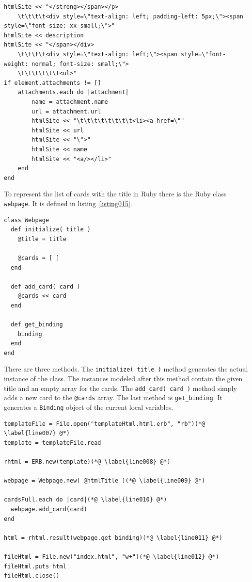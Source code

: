 \begin{lstlisting}[aboveskip=1\baselineskip, caption=Generating HTML without a templating engine., label=listing014]
htmlSite << "</strong></span></p>
	\t\t\t\t<div style=\"text-align: left; padding-left: 5px;\"><span style=\"font-size: xx-small;\">"
htmlSite << description		
htmlSite << "</span></div>
	\t\t\t\t<div style=\"text-align: left;\"><span style=\"font-weight: normal; font-size: small;\"> 
	\t\t\t\t\t\t<ul>"
if element.attachments != []
	attachments.each do |attachment|
		name = attachment.name
		url = attachment.url
		htmlSite << "\t\t\t\t\t\t\t\t<li><a href=\""
		htmlSite << url
		htmlSite << "\">"
		htmlSite << name
		htmlSite << "<a/></li>"
	end	
end	
\end{lstlisting}

To represent the list of cards with the title in Ruby there is the Ruby class \texttt{webpage}. It is defined in listing \ref{listing015}.

\begin{lstlisting}[aboveskip=1\baselineskip, caption=Generating HTML without a templating engine., label=listing015]
class Webpage
  def initialize( title )
    @title = title

    @cards = [ ]
  end

  def add_card( card )
    @cards << card
  end

  def get_binding
    binding
  end
end
\end{lstlisting}

There are three methods. The \lstinline{initialize( title )} method generates the actual instance of the class. The instances modeled after this method contain the given title and an empty array for the cards. The \lstinline{add_card( card )} method simply adds a new card to the \lstinline{@cards} array. The last method is \lstinline{get_binding}. It generates a \lstinline{Binding} object of the current local variables.

\begin{lstlisting}[aboveskip=1\baselineskip, caption=Generating HTML with ERB., label=listing016]
templateFile = File.open("templateHtml.html.erb", "rb")(*@ \label{line007} @*)
template = templateFile.read

rhtml = ERB.new(template)(*@ \label{line008} @*)

webpage = Webpage.new( @htmlTitle )(*@ \label{line009} @*)

cardsFull.each do |card|(*@ \label{line010} @*)
  webpage.add_card(card)
end

html = rhtml.result(webpage.get_binding)(*@ \label{line011} @*)

fileHtml = File.new("index.html", "w+")(*@ \label{line012} @*)
fileHtml.puts html
fileHtml.close()
\end{lstlisting}

